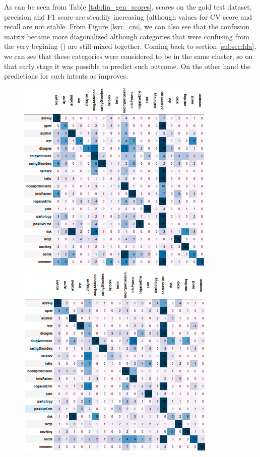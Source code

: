 \documentclass[11pt]{article}
\begin{document}
As can be seen from Table \ref{tab:lin_gen_scores}, scores on the gold
test dataset, precision and F1 score are steadily increasing (although
values for CV score and recall are not stable.  From Figure \ref{lsvc_cm}, we can also see that the
confusion matrix became more diagonalized although categories that
were confusing from the very begining ({}) are still mixed
together. Coming back to section \ref{subsec:lda}, we can see that
these categories were considered to be in the same cluster, so on that
early stage it was possible to predict such outcome. On the other hand
the predictions for such intents as {} improves.

\begin{figure}[h]
	\centering
	\includegraphics[scale=0.3]{lsvc_0.png}
	\includegraphics[scale=0.3]{lsvc_1.png}

\end{figure}
\end{document}
